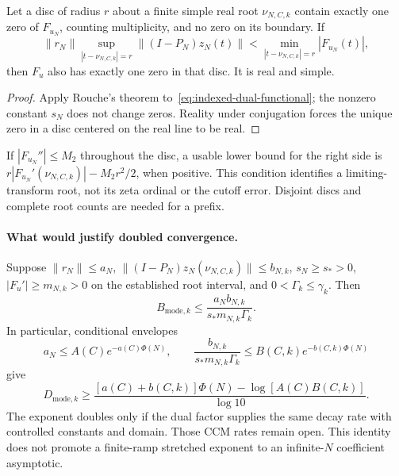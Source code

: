\begin{proposition}
\label{prop:indexed-resolution-disc}
Let a disc of radius $r$ about a finite simple real root $\nu_{N,C,k}$
contain exactly one zero of $F_{u_N}$, counting multiplicity, and no zero
on its boundary. If
\begin{equation}\label{eq:indexed-resolution-disc}
 \|r_N\|\sup_{|t-\nu_{N,C,k}|=r}\|(I-P_N)z_N(t)\|
  <\min_{|t-\nu_{N,C,k}|=r}|F_{u_N}(t)|,
\end{equation}
then $F_u$ also has exactly one zero in that disc. It is real and simple.
\end{proposition}
\begin{proof}
Apply Rouche's theorem to~\eqref{eq:indexed-dual-functional}; the nonzero
constant $s_N$ does not change zeros. Reality under conjugation forces the
unique zero in a disc centered on the real line to be real.
\end{proof}
If $|F_{u_N}''|\le M_2$ throughout the disc, a usable lower bound for
the right side is
$r|F_{u_N}'(\nu_{N,C,k})|-M_2r^2/2$, when positive. This condition
identifies a limiting-transform root, not its zeta ordinal or the cutoff
error. Disjoint discs and complete root counts are needed for a prefix.

\paragraph{What would justify doubled convergence.}
Suppose $\|r_N\|\le a_N$, $\|(I-P_N)z_N(\nu_{N,C,k})\|\le b_{N,k}$,
$s_N\ge s_*>0$, $|F_u'|\ge m_{N,k}>0$ on the established root interval,
and $0<\Gamma_k\le\gamma_k$. Then
\begin{equation}\label{eq:indexed-dual-budget}
 B_{\mathrm{mode},k}\le\frac{a_Nb_{N,k}}{s_*m_{N,k}\Gamma_k}.
\end{equation}
In particular, conditional envelopes
\[
 a_N\le A(C)e^{-a(C)\Phi(N)},\qquad
 \frac{b_{N,k}}{s_*m_{N,k}\Gamma_k}
       \le B(C,k)e^{-b(C,k)\Phi(N)}
\]
give
\begin{equation}\label{eq:indexed-dual-depth}
 D_{\mathrm{mode},k}\ge
 \frac{[a(C)+b(C,k)]\Phi(N)-\log[A(C)B(C,k)]}{\log10}.
\end{equation}
The exponent doubles only if the dual factor supplies the same decay rate
with controlled constants and domain. Those CCM rates remain open. This
identity does not promote a finite-ramp stretched exponent to an
infinite-$N$ coefficient asymptotic.

